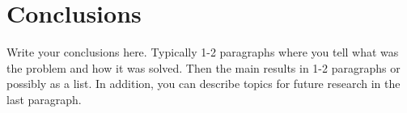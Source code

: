\chapter{Conclusions}
\label{conclusions}

Write your conclusions here. Typically 1-2 paragraphs where you tell
what was the problem and how it was solved. Then the main results in
1-2 paragraphs or possibly as a list. In addition, you can describe 
topics for future research in the last paragraph.
